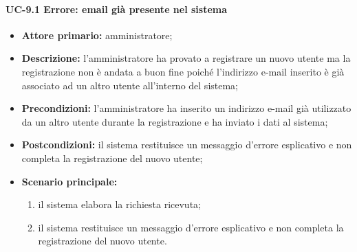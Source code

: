     \paragraph{UC-9.1 Errore: email già presente nel sistema}
    \begin{itemize}
        \item \textbf{Attore primario:} amministratore;
    
        \item \textbf{Descrizione:} l'amministratore ha provato a registrare un nuovo utente ma la registrazione non è andata a buon fine poiché l'indirizzo e-mail inserito è già associato ad un altro utente all'interno del sistema;
    
        \item \textbf{Precondizioni:} l'amministratore ha inserito un indirizzo e-mail già utilizzato da un altro utente durante la registrazione e ha inviato i dati al sistema;
    
        \item \textbf{Postcondizioni:} il sistema restituisce un messaggio d'errore esplicativo e non completa la registrazione del nuovo utente;
    
        \item \textbf{Scenario principale:}
              \begin{enumerate}
                  \item il sistema elabora la richiesta ricevuta;
                  \item il sistema restituisce un messaggio d'errore esplicativo e non completa la registrazione del nuovo utente.
              \end{enumerate}
    \end{itemize}

